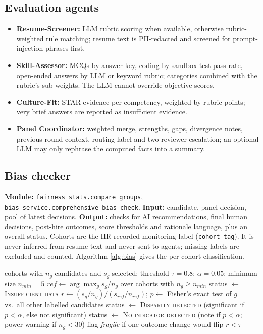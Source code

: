 \subsection{Evaluation agents}
\begin{itemize}
\item \textbf{Resume-Screener:} LLM rubric scoring when available, otherwise rubric-weighted rule matching; resume text is PII-redacted and screened for prompt-injection phrases first.
\item \textbf{Skill-Assessor:} MCQs by answer key, coding by sandbox test pass rate, open-ended answers by LLM or keyword rubric; categories combined with the rubric's sub-weights. The LLM cannot override objective scores.
\item \textbf{Culture-Fit:} STAR evidence per competency, weighted by rubric points; very brief answers are reported as insufficient evidence.
\item \textbf{Panel Coordinator:} weighted merge, strengths, gaps, divergence notes, previous-round context, routing label and two-reviewer escalation; an optional LLM may only rephrase the computed facts into a summary.
\end{itemize}

\subsection{Bias checker}
\textbf{Module:} \texttt{fairness\_stats.compare\_groups}, \texttt{bias\_service.comprehensive\_bias\_check}.
\textbf{Input:} candidate, panel decision, pool of latest decisions. \textbf{Output:} checks for AI recommendations, final human decisions, post-hire outcomes, score thresholds and rationale language, plus an overall status.
Cohorts are the HR-recorded monitoring label (\texttt{cohort\_tag}). It is never inferred from resume text and never sent to agents; missing labels are excluded and counted. Algorithm \ref{alg:bias} gives the per-cohort classification.

\begin{algorithm}[H]
\caption{Cohort selection-rate classification} \label{alg:bias}
\begin{algorithmic}[1]
\Require cohorts with $n_g$ candidates and $s_g$ selected; threshold $\tau = 0.8$; $\alpha = 0.05$; minimum size $n_{min} = 5$
\State $ref \gets \arg\max_g s_g/n_g$ over cohorts with $n_g \ge n_{min}$
   \State status $\gets$ \textsc{Insufficient data}
  \Else
    \State $r \gets (s_g/n_g) / (s_{ref}/n_{ref})$; $p \gets$ Fisher's exact test of $g$ vs.\ all other labelled candidates
     \State status $\gets$ \textsc{Disparity detected} (significant if $p<\alpha$, else not significant)
    \Else \State status $\gets$ \textsc{No indicator detected} (note if $p<\alpha$; power warning if $n_g<30$) \EndIf
    \State flag \emph{fragile} if one outcome change would flip $r < \tau$
  \EndIf
\EndFor
\end{algorithmic}
\end{algorithm}

